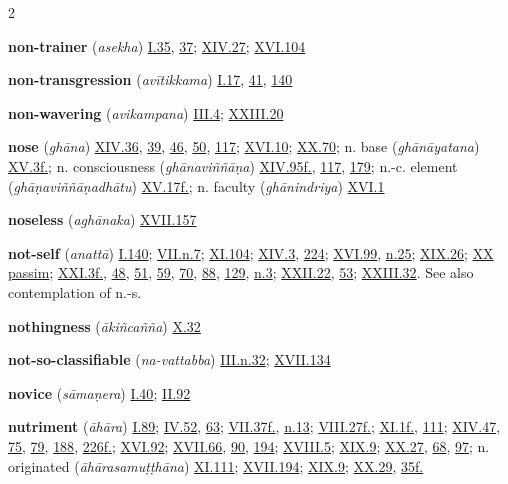 \begin{multicols}{2}
\begin{vismHanging}
\par\textbf{non-trainer} (\emph{asekha}) \hyperlink{I.35}{I.35}{}, \hyperlink{I.37}{37}{}; \hyperlink{XIV.27}{XIV.27}{}; \hyperlink{XVI.104}{XVI.104}{}
\par\textbf{non-transgression} (\emph{avītikkama}) \hyperlink{I.17}{I.17}{}, \hyperlink{I.41}{41}{}, \hyperlink{I.140}{140}{}
\par\textbf{non-wavering} (\emph{avikampana}) \hyperlink{III.4}{III.4}{}; \hyperlink{XXIII.20}{XXIII.20}{}
\par\textbf{nose} (\emph{ghāna}) \hyperlink{XIV.36}{XIV.36}{}, \hyperlink{XIV.39}{39}{}, \hyperlink{XIV.46}{46}{}, \hyperlink{XIV.50}{50}{}, \hyperlink{XIV.117}{117}{}; \hyperlink{XVI.10}{XVI.10}{}; \hyperlink{XX.70}{XX.70}{}; n. base (\emph{ghānāyatana}) \hyperlink{XV.3}{XV.3f.}{}; n. consciousness (\emph{ghānaviññāṇa}) \hyperlink{XIV.95}{XIV.95f.}{}, \hyperlink{XIV.117}{117}{}, \hyperlink{XIV.179}{179}{}; n.-c. element (\emph{ghāṇaviññāṇadhātu}) \hyperlink{XV.17}{XV.17f.}{}; n. faculty (\emph{ghānindriya}) \hyperlink{XVI.1}{XVI.1}{}
\par\textbf{noseless} (\emph{aghānaka}) \hyperlink{XVII.157}{XVII.157}{}
\par\textbf{not-self} (\emph{anattā}) \hyperlink{I.140}{I.140}{}; \hyperlink{VII.n7}{VII.n.7}{}; \hyperlink{XI.104}{XI.104}{}; \hyperlink{XIV.3}{XIV.3}{}, \hyperlink{XIV.224}{224}{}; \hyperlink{XVI.99}{XVI.99}{}, \hyperlink{XVI.n25}{n.25}{}; \hyperlink{XIX.26}{XIX.26}{}; \hyperlink{XX}{XX passim}{}; \hyperlink{XXI.3}{XXI.3f.}{}, \hyperlink{XXI.48}{48}{}, \hyperlink{XXI.51}{51}{}, \hyperlink{XXI.59}{59}{}, \hyperlink{XXI.70}{70}{}, \hyperlink{XXI.88}{88}{}, \hyperlink{XXI.129}{129}{}, \hyperlink{XXI.n3}{n.3}{}; \hyperlink{XXII.22}{XXII.22}{}, \hyperlink{XXII.53}{53}{}; \hyperlink{XXIII.32}{XXIII.32}{}. See also contemplation of n.-s. 
\par\textbf{nothingness} (\emph{ākiñcañña}) \hyperlink{X.32}{X.32}{}
\par\textbf{not-so-classifiable} (\emph{na-vattabba}) \hyperlink{III.n32}{III.n.32}{}; \hyperlink{XVII.134}{XVII.134}{}
\par\textbf{novice} (\emph{sāmaṇera}) \hyperlink{I.40}{I.40}{}; \hyperlink{II.92}{II.92}{}
\par\textbf{nutriment} (\emph{āhāra}) \hyperlink{I.89}{I.89}{}; \hyperlink{IV.52}{IV.52}{}, \hyperlink{IV.63}{63}{}; \hyperlink{VII.37}{VII.37f.}{}, \hyperlink{VII.n13}{n.13}{}; \hyperlink{VIII.27}{VIII.27f.}{}; \hyperlink{XI.1}{XI.1f.}{}, \hyperlink{XI.111}{111}{}; \hyperlink{XIV.47}{XIV.47}{}, \hyperlink{XIV.75}{75}{}, \hyperlink{XIV.79}{79}{}, \hyperlink{XIV.188}{188}{}, \hyperlink{XIV.226}{226f.}{}; \hyperlink{XVI.92}{XVI.92}{}; \hyperlink{XVII.66}{XVII.66}{}, \hyperlink{XVII.90}{90}{}, \hyperlink{XVII.194}{194}{}; \hyperlink{XVIII.5}{XVIII.5}{}; \hyperlink{XIX.9}{XIX.9}{}; \hyperlink{XX.27}{XX.27}{}, \hyperlink{XX.68}{68}{}, \hyperlink{XX.97}{97}{}; n. originated (\emph{āhārasamuṭṭhāna}) \hyperlink{XI.111}{XI.111}{}; \hyperlink{XVII.194}{XVII.194}{}; \hyperlink{XIX.9}{XIX.9}{}; \hyperlink{XX.29}{XX.29}{}, \hyperlink{XX.35}{35f.}{}

\end{vismHanging}
\end{multicols}
